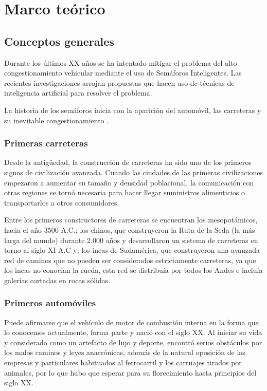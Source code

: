 \chapter{Marco teórico}

\section{Conceptos generales}
Durante los últimos XX años se ha intentado mitigar el problema del alto congestionamiento vehicular mediante el uso de Semáforos Inteligentes. Las recientes investigaciones arrojan propuestas que hacen uso  de técnicas de inteligencia artificial para resolver el problema.

La historia de los semáforos inicia con la aparición del automóvil, las carreteras y su inevitable congestionamiento \cite{arandia}.

\subsection{Primeras carreteras}
Desde la antigüedad, la construcción de carreteras ha sido uno de los primeros signos de civilización avanzada. Cuando las ciudades de las primeras civilizaciones empezaron a aumentar su tamaño y densidad poblacional, la comunicación con otras regiones se tornó necesaria para hacer llegar suministros alimenticios o transportarlos a otros consumidores.

Entre los primeros constructores de carreteras se encuentran los mesopotámicos, hacia el año 3500 A.C.; los chinos, que construyeron la Ruta de la Seda (la más larga del mundo) durante 2.000 años y desarrollaron un sistema de carreteras en torno al siglo XI A.C y; los incas de Sudamérica, que construyeron una avanzada red de caminos que no pueden ser considerados estrictamente carreteras, ya que los incas no conocían la rueda, esta red se distribuía por todos los Andes e incluía galerías cortadas en rocas sólidas.

\subsection{Primeros automóviles}
Puede afirmarse que el vehículo de motor de combustión interna en la forma que lo conocemos actualmente, forma parte y nació con el siglo XX.
Al iniciar su vida y considerado como un artefacto de lujo y deporte, encontró serios obstáculos por los malos caminos y leyes anacrónicas, además de la natural oposición de las empresas y particulares habituados al ferrocarril y los carruajes tirados por animales, por lo que hubo que esperar para su florecimiento hasta principios del siglo XX.

